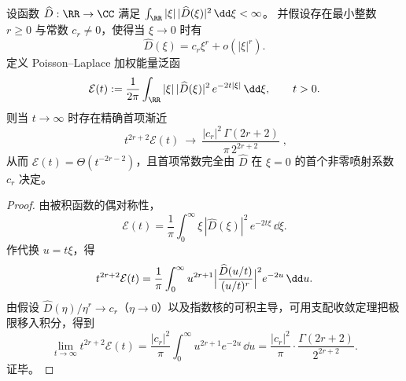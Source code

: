 \begin{proposition}\label{prop:xi-poisson-laplace-energy-multipole-decay}
设函数 \(\widehat D:\RR\to\CC\) 满足 \(\int_{\RR}|\xi|\,|\widehat D(\xi)|^2\,\dd\xi<\infty\)。
并假设存在最小整数 \(r\ge0\) 与常数 \(c_r\ne0\)，使得当 \(\xi\to0\) 时有
\[
\widehat D(\xi)=c_r\xi^r+o(|\xi|^r).
\]
定义 Poisson--Laplace 加权能量泛函
\[
\mathcal{E}(t):=\frac{1}{2\pi}\int_{\RR}|\xi|\,|\widehat D(\xi)|^2\,e^{-2t|\xi|}\,\dd\xi,\qquad t>0.
\]
则当 \(t\to\infty\) 时存在精确首项渐近
\[
\boxed{\;
t^{2r+2}\mathcal{E}(t)\ \longrightarrow\
\frac{|c_r|^2\,\Gamma(2r+2)}{\pi\,2^{2r+2}}\; } ,
\]
从而 \(\mathcal{E}(t)=\Theta(t^{-2r-2})\)，且首项常数完全由 \(\widehat D\) 在 \(\xi=0\) 的首个非零喷射系数 \(c_r\) 决定。
\end{proposition}
\begin{proof}
由被积函数的偶对称性，
\[
\mathcal{E}(t)=\frac{1}{\pi}\int_{0}^{\infty}\xi\,|\widehat D(\xi)|^2\,e^{-2t\xi}\,\dd\xi.
\]
作代换 \(u=t\xi\)，得
\[
t^{2r+2}\mathcal{E}(t)=\frac{1}{\pi}\int_{0}^{\infty}u^{2r+1}
\Bigl|\frac{\widehat D(u/t)}{(u/t)^r}\Bigr|^2e^{-2u}\,\dd u.
\]
由假设 \(\widehat D(\eta)/\eta^r\to c_r\)（\(\eta\to0\)）以及指数核的可积主导，可用支配收敛定理把极限移入积分，得到
\[
\lim_{t\to\infty}t^{2r+2}\mathcal{E}(t)
=\frac{|c_r|^2}{\pi}\int_{0}^{\infty}u^{2r+1}e^{-2u}\,\dd u
=\frac{|c_r|^2}{\pi}\cdot\frac{\Gamma(2r+2)}{2^{2r+2}}.
\]
证毕。
\end{proof}

